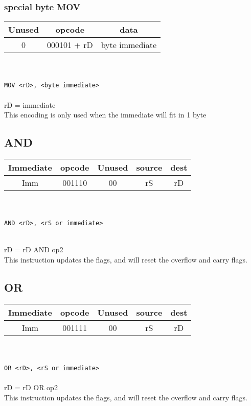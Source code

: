 \documentclass{article}
\newcommand{\instrr}[2]{
\subsection{#1}
	\begin{tabular}{| c | c | c  | c | c |}
	\hline
	Immediate & opcode & Unused & source & dest \\ \hline
	Imm & #2 & 00 & rS & rD \\
	\hline
	\end{tabular} \\ \\
	\noindent
	\texttt{#1 \textless rD\textgreater , \textless rS or immediate\textgreater \\ \\}
}
\begin{document}
	\subsubsection{special byte MOV}
	\begin{tabular}{| c | c | c |}
	\hline
	Unused & opcode & data \\ \hline
	0 & 000101 + rD & byte immediate \\ \hline
	\end{tabular} \\ \\
	\texttt{MOV \textless rD\textgreater , \textless byte immediate\textgreater \\ \\}
	rD = immediate \\
	This encoding is only used when the immediate will fit in 1 byte
	\instrr{AND}{001110}\noindent
	
	rD = rD AND op2  \\
	This instruction updates the flags, and will reset the overflow and carry flags. \\
	\instrr{OR}{001111}\noindent
	rD = rD OR op2 \\
	This instruction updates the flags, and will reset the overflow and carry flags. \\
\end{document}
